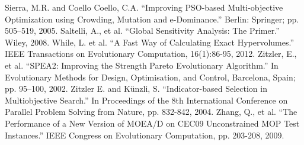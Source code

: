 \newline
\newline
\noindent
Sierra, M.R. and Coello Coello, C.A.  ``Improving PSO-based Multi-objective Optimization using Crowding, Mutation and e-Dominance.''  Berlin: Springer; pp. 505–519, 2005.
\newline
\newline
\noindent
Saltelli, A., et al. ``Global Sensitivity Analysis: The Primer.'' Wiley, 2008.
\newline
\newline
\noindent
While, L. et al.  ``A Fast Way of Calculating Exact Hypervolumes.''  IEEE Transactions on Evolutionary Computation, 16(1):86-95, 2012.
\newline
\newline
\noindent
Zitzler, E., et al.  ``SPEA2: Improving the Strength Pareto Evolutionary Algorithm.''  In Evolutionary Methods for Design, Optimisation, and Control, Barcelona, Spain; pp. 95–100, 2002.
\newline
\newline
\noindent
Zitzler E. and K\"unzli, S.  ``Indicator-based Selection in Multiobjective Search.''  In Proceedings of the 8th International Conference on Parallel Problem Solving from Nature, pp. 832-842, 2004.
\newline
\newline
\noindent
Zhang, Q., et al. ``The Performance of a New Version of MOEA/D on CEC09 Unconstrained MOP Test Instances.'' IEEE Congress on Evolutionary Computation, pp. 203-208, 2009. 
